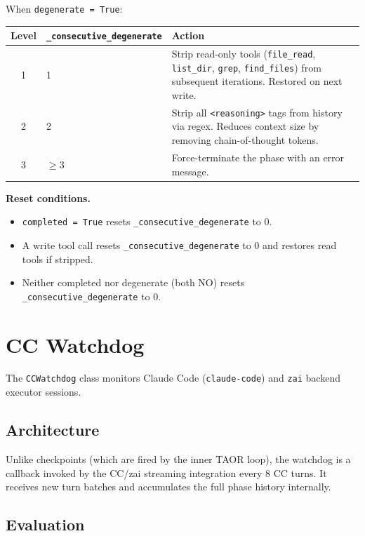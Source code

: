 \documentclass[11pt,letterpaper]{report}
\newcommand{\code}[1]{\texttt{#1}}
\begin{document}
When \code{degenerate = True}:

\begin{table}[h]
\centering
\begin{tabular}{@{}clp{7cm}@{}}
\toprule
Level & \code{\_consecutive\_degenerate} & Action \\
\midrule
1 & 1 & Strip read-only tools (\code{file\_read}, \code{list\_dir},
        \code{grep}, \code{find\_files}) from subsequent iterations.
        Restored on next write. \\
2 & 2 & Strip all \code{<reasoning>} tags from history via regex.
        Reduces context size by removing chain-of-thought tokens. \\
3 & $\geq 3$ & Force-terminate the phase with an error message. \\
\bottomrule
\end{tabular}
\end{table}

\noindent\textbf{Reset conditions.}
\begin{itemize}[nosep]
  \item \code{completed = True} resets \code{\_consecutive\_degenerate} to 0.
  \item A write tool call resets \code{\_consecutive\_degenerate} to 0
        and restores read tools if stripped.
  \item Neither completed nor degenerate (both NO) resets
        \code{\_consecutive\_degenerate} to 0.
\end{itemize}


\section{CC Watchdog}
\label{sec:watchdog}

The \code{CCWatchdog} class monitors Claude Code
(\code{claude-code}) and \code{zai} backend executor sessions.

\subsection{Architecture}

Unlike checkpoints (which are fired by the inner TAOR loop), the
watchdog is a callback invoked by the CC/zai streaming integration
every 8 CC turns. It receives new turn batches and accumulates the full
phase history internally.

\subsection{Evaluation}
\end{document}
